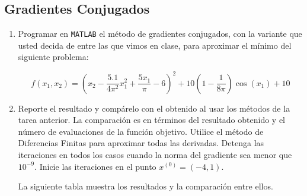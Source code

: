 \documentclass[12pt]{article}
\begin{document}
\subsection*{Gradientes Conjugados}

\begin{enumerate}
\item Programar en \verb|MATLAB| el método de gradientes conjugados, con la variante que usted decida de entre las que vimos en clase, para aproximar el mínimo del siguiente problema:

\[f(x_1,x_2) = \left(x_2-\dfrac{5.1}{4\pi^2}x_1^2 + \frac{5x_1}{\pi}-6\right)^2 + 10\left(1-\dfrac{1}{8\pi}\right) \cos(x_1) + 10\]

\item Reporte el resultado y compárelo con el obtenido al usar los métodos de la tarea anterior. La comparación es en términos del resultado obtenido y el número de evaluaciones de la función objetivo. Utilice el método de Diferencias Finitas para aproximar todas las derivadas. Detenga las iteraciones en todos los casos cuando la norma del gradiente sea menor que $10^{-9}$. Inicie las iteraciones en el punto $x^{(0)} = (-4,1)$.

La siguiente tabla muestra los resultados y la comparación entre ellos.


\end{enumerate}
\end{document}
